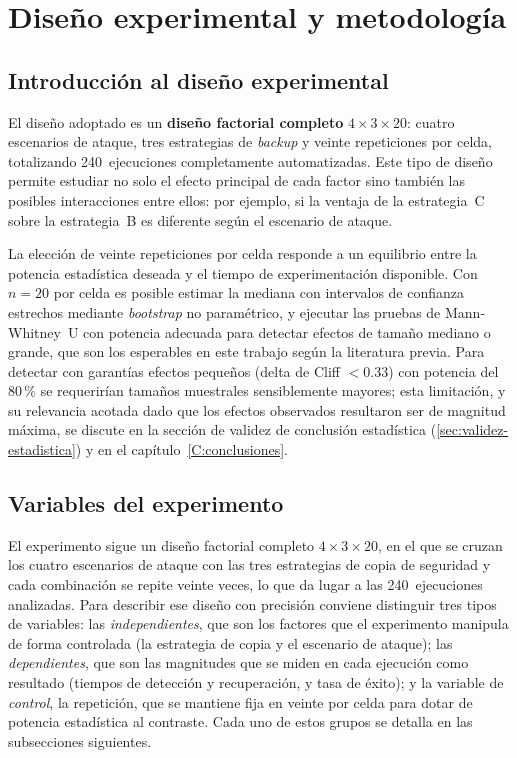 \documentclass[../main.tex]{subfiles}
\begin{document}

\chapter{Diseño experimental y metodología}
\label{C:disenyo}

\section{Introducción al diseño experimental}

El diseño adoptado es un \textbf{diseño factorial completo} $4 \times 3 \times 20$:
cuatro escenarios de ataque, tres estrategias de \emph{backup} y veinte repeticiones
por celda, totalizando 240~ejecuciones completamente automatizadas. Este tipo de
diseño permite estudiar no solo el efecto principal de cada factor sino también
las posibles interacciones entre ellos: por ejemplo, si la ventaja de la estrategia~C
sobre la estrategia~B es diferente según el escenario de ataque.

La elección de veinte repeticiones por celda responde a un equilibrio entre la
potencia estadística deseada y el tiempo de experimentación disponible. Con
$n = 20$ por celda es posible estimar la mediana con intervalos de confianza
estrechos mediante \emph{bootstrap} no paramétrico, y ejecutar las pruebas de
Mann-Whitney~U con potencia adecuada para detectar efectos de tamaño mediano o
grande, que son los esperables en este trabajo según la literatura previa. Para
detectar con garantías efectos pequeños (delta de Cliff $< 0.33$) con potencia del
80\,\% se requerirían tamaños muestrales sensiblemente mayores; esta limitación, y
su relevancia acotada dado que los efectos observados resultaron ser de magnitud
máxima, se discute en la sección de validez de conclusión estadística
(\ref{sec:validez-estadistica}) y en el capítulo~\ref{C:conclusiones}.

\section{Variables del experimento}

El experimento sigue un diseño factorial completo $4 \times 3 \times 20$, en el que
se cruzan los cuatro escenarios de ataque con las tres estrategias de copia de
seguridad y cada combinación se repite veinte veces, lo que da lugar a las
240~ejecuciones analizadas. Para describir ese diseño con precisión conviene
distinguir tres tipos de variables: las \emph{independientes}, que son los
factores que el experimento manipula de forma controlada (la estrategia de copia
y el escenario de ataque); las \emph{dependientes}, que son las magnitudes que se
miden en cada ejecución como resultado (tiempos de detección y recuperación, y
tasa de éxito); y la variable de \emph{control}, la repetición, que se mantiene
fija en veinte por celda para dotar de potencia estadística al contraste. Cada
uno de estos grupos se detalla en las subsecciones siguientes.
\end{document}
